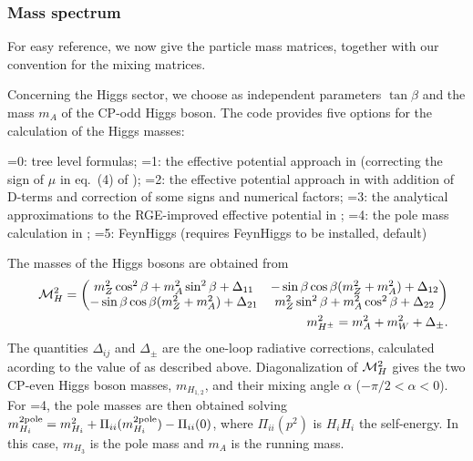 \subsubsection{Mass spectrum}

For easy reference, we now give the particle mass matrices, together with our
convention for the mixing matrices.

Concerning the Higgs sector, we choose as independent parameters $\tan\beta$
and the mass $m_A$ of the CP-odd Higgs boson. The code provides five options
for the calculation of the Higgs masses: 


=0:  tree level formulas;
=1: the effective potential approach in
\cite{Ellis:1990nz,Ellis:1991zd,Brignole:1991pq} (correcting the sign of $\mu$ in eq.~(4) of
\cite{Brignole:1991pq}); 
=2: the effective potential approach in \cite{Drees:1991mx}
  with addition of D-terms and correction of some signs and numerical factors;
=3: the analytical approximations to the
  RGE-improved effective potential in \cite{Carena:1995bx};
=4: the pole mass calculation in \cite{Carena:1995wu};
=5: FeynHiggs (requires FeynHiggs to be
installed, default) \cite{Hahn:2010te}

The  masses of the Higgs bosons are obtained from
\begin{eqnarray}
&&  {\cal M}^2_{H} = 
  \left( %
      \begin{matrix} 
      {m_Z^2 \cos^2\beta + m_A^2 \sin^2\beta + \Delta_{11} } &
      {-\sin\beta\cos\beta(m_Z^2+m_A^2) + \Delta_{12} }
      \cr
      {-\sin\beta\cos\beta(m_Z^2+m_A^2) + \Delta_{21} } &
      {m_Z^2 \sin^2\beta + m_A^2 \cos^2\beta + \Delta_{22} }
      \end{matrix} %
      \right) 
  \\
&&  m^2_{H^{\pm}} = m_{A}^2+m_W^2 + \Delta_{\pm}.
\end{eqnarray}
The quantities $\Delta_{ij}$ and $\Delta_{\pm}$ are the one-loop
radiative corrections, calculated acording to the value of  as
described above. Diagonalization of $ {\cal M}^2_{H} $ gives the two CP-even
Higgs boson masses, $ m_{H_{1,2}} $, and their mixing angle $\alpha$ ($ -\pi/2
< \alpha < 0$). For =4, the pole masses are then obtained solving
$ m^{2\rm pole}_{H_i} = m^2_{H_i} + \Pi_{ii}(m^{2\rm pole}_{H_i}) - \Pi_{ii}(0)
$, where $\Pi_{ii}(p^2)$ is $H_iH_i$ the self-energy. In this case, $m_{H_3}$
is the pole mass and $m_A$ is the running mass.

